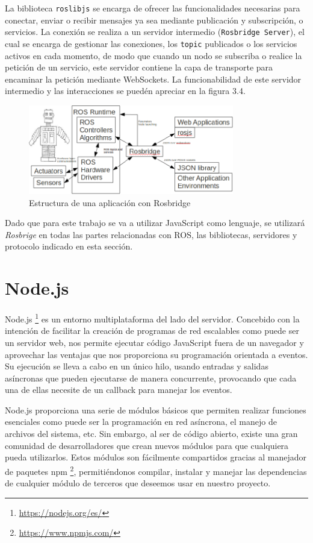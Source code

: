 La biblioteca \texttt{roslibjs} se encarga de ofrecer las funcionalidades necesarias para conectar, enviar o recibir mensajes ya sea mediante publicación y subscripción, o servicios. La conexión se realiza a un servidor intermedio (\texttt{Rosbridge Server}), el cual se encarga de gestionar las conexiones, los \texttt{topic} publicados o los servicios activos en cada momento, de modo que cuando un nodo se subscriba o realice la petición de un servicio, este servidor contiene la capa de transporte para encaminar la petición mediante WebSockets. La funcionabilidad de este servidor intermedio y las interacciones se puedén apreciar en la figura 3.4.

\begin{figure}[H]
  \begin{center}
    \includegraphics[width=0.8\textwidth]{figures/estructurarosbridge.png}
		\caption{Estructura de una aplicación con Rosbridge}
		\label{fig.estructurarosbridge}
		\end{center}
\end{figure}

Dado que para este trabajo se va a utilizar JavaScript como lenguaje, se utilizará \textit{Rosbrige} en todas las partes relacionadas con ROS, las bibliotecas, servidores y protocolo indicado en esta sección.
\section{Node.js}
Node.js \footnote{\url{https://nodejs.org/es/}} es un entorno multiplataforma del lado del servidor. Concebido con la intención de facilitar la creación de programas de red escalables como puede ser un servidor web, nos permite ejecutar código JavaScript fuera de un navegador y aprovechar las ventajas que nos proporciona su programación orientada a eventos. Su ejecución se lleva a cabo en un único hilo, usando entradas y salidas asíncronas que pueden ejecutarse de manera concurrente, provocando que cada una de ellas necesite de un callback para manejar los eventos. 

Node.js proporciona una serie de módulos básicos que permiten realizar funciones esenciales como puede ser la programación en red asíncrona, el manejo de archivos del sistema, etc. Sin embargo, al ser de código abierto, existe una gran comunidad de desarrolladores que crean nuevos módulos para que cualquiera pueda utilizarlos. Estos módulos son fácilmente compartidos gracias al manejador de paquetes npm \footnote{\url{https://www.npmjs.com/}}, permitiéndonos compilar, instalar y manejar las dependencias de cualquier módulo de terceros que deseemos usar en nuestro proyecto.
 
